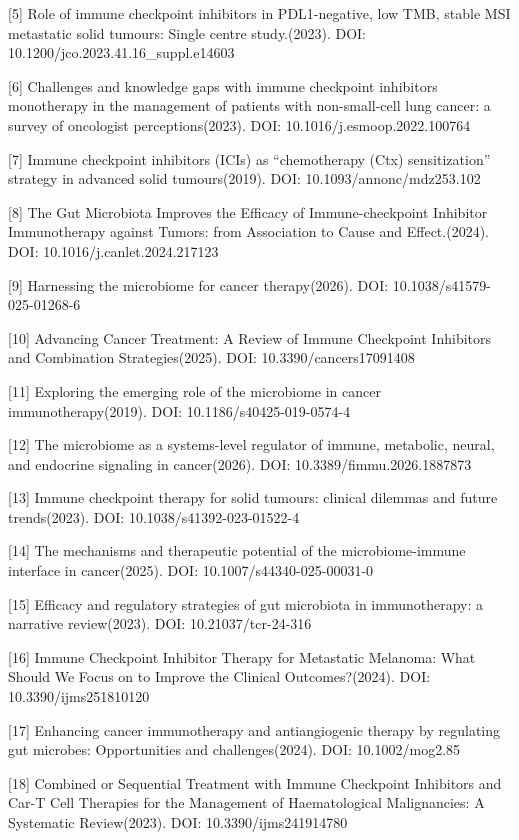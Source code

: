 {[}5{]} Role of immune checkpoint inhibitors in PDL1-negative, low TMB, stable MSI metastatic solid tumours: Single centre study.(2023). DOI: 10.1200/jco.2023.41.16\_suppl.e14603

{[}6{]} Challenges and knowledge gaps with immune checkpoint inhibitors monotherapy in the management of patients with non-small-cell lung cancer: a survey of oncologist perceptions(2023). DOI: 10.1016/j.esmoop.2022.100764

{[}7{]} Immune checkpoint inhibitors (ICIs) as ``chemotherapy (Ctx) sensitization'' strategy in advanced solid tumours(2019). DOI: 10.1093/annonc/mdz253.102

{[}8{]} The Gut Microbiota Improves the Efficacy of Immune-checkpoint Inhibitor Immunotherapy against Tumors: from Association to Cause and Effect.(2024). DOI: 10.1016/j.canlet.2024.217123

{[}9{]} Harnessing the microbiome for cancer therapy(2026). DOI: 10.1038/s41579-025-01268-6

{[}10{]} Advancing Cancer Treatment: A Review of Immune Checkpoint Inhibitors and Combination Strategies(2025). DOI: 10.3390/cancers17091408

{[}11{]} Exploring the emerging role of the microbiome in cancer immunotherapy(2019). DOI: 10.1186/s40425-019-0574-4

{[}12{]} The microbiome as a systems-level regulator of immune, metabolic, neural, and endocrine signaling in cancer(2026). DOI: 10.3389/fimmu.2026.1887873

{[}13{]} Immune checkpoint therapy for solid tumours: clinical dilemmas and future trends(2023). DOI: 10.1038/s41392-023-01522-4

{[}14{]} The mechanisms and therapeutic potential of the microbiome-immune interface in cancer(2025). DOI: 10.1007/s44340-025-00031-0

{[}15{]} Efficacy and regulatory strategies of gut microbiota in immunotherapy: a narrative review(2023). DOI: 10.21037/tcr-24-316

{[}16{]} Immune Checkpoint Inhibitor Therapy for Metastatic Melanoma: What Should We Focus on to Improve the Clinical Outcomes?(2024). DOI: 10.3390/ijms251810120

{[}17{]} Enhancing cancer immunotherapy and antiangiogenic therapy by regulating gut microbes: Opportunities and challenges(2024). DOI: 10.1002/mog2.85

{[}18{]} Combined or Sequential Treatment with Immune Checkpoint Inhibitors and Car-T Cell Therapies for the Management of Haematological Malignancies: A Systematic Review(2023). DOI: 10.3390/ijms241914780


